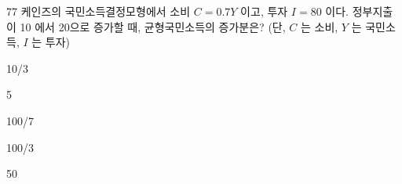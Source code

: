 \begin{question}{77}
케인즈의 국민소득결정모형에서 소비 $C=0.7Y$ 이고, 투자 $I=80$ 이다. 정부지출이 10 에서 20으로 증가할 때, 균형국민소득의 증가분은? (단, $C$ 는 소비, $Y$ 는 국민소득, $I$ 는 투자)
\begin{choices}
  \item 10/3
  \item 5
  \item 100/7
  \item 100/3
  \item 50
\end{choices}
\end{question}
